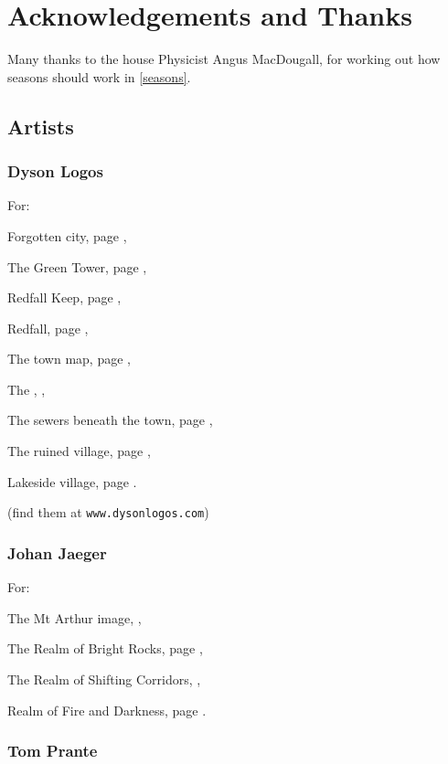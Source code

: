 
\section*{Acknowledgements and Thanks}

\begin{multicols}{2}

Many thanks to the house Physicist Angus MacDougall, for working out how seasons should work in \autoref{seasons}.

\subsection*{Artists}

\subsubsection{Dyson Logos}

For:

Forgotten city, page \pageref{lost_city_map},

The Green Tower, page \pageref{green_tower_map},

Redfall Keep, page \pageref{redfall_keep_map},

Redfall, page \pageref{redfall_map},

The town map, page \pageref{town_map},

The , \pageref{mincing_pig_map},

The sewers beneath the town, page \pageref{sewer_map},

The ruined village, page \pageref{ruined_village_map},

Lakeside village, page \pageref{lakeside}.

(find them at {\tt www.dysonlogos.com})

\subsubsection{Johan Jaeger}

For:

The Mt Arthur image, \pageref{johan:river},

The Realm of Bright Rocks, page \pageref{johan:desert},

The Realm of Shifting Corridors, \pageref{johan:rocks},

Realm of Fire and Darkness, page \pageref{johan:darkness}.

\subsubsection{Tom Prante}


\end{multicols}
